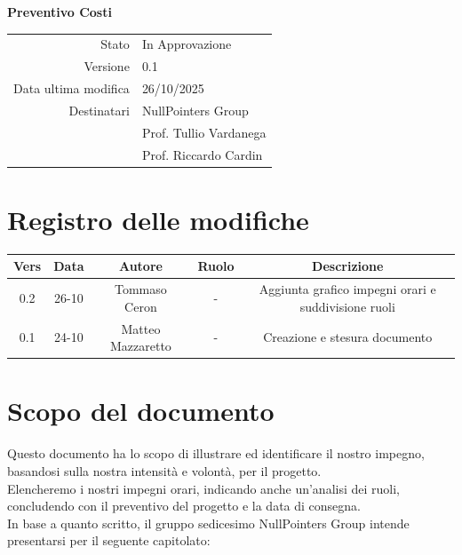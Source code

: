 \documentclass{article}
\begin{document}
	\vspace{2cm}
	
	{
		\centering
		\Huge\bfseries Preventivo Costi\par
		\vspace{0.5cm}
	}
	
	\begin{center}
		\begin{tabular}{r|l}
			Stato & In Approvazione \\
			Versione & 0.1 \\
			Data ultima modifica & 26/10/2025 \\
			Destinatari & NullPointers Group \\
			& Prof. Tullio Vardanega \\
			& Prof. Riccardo Cardin \\
		\end{tabular}
	\end{center}
	
	\newpage
	\section{Registro delle modifiche}
	
	\begin{table}[htbp]
		\begin{tabular}{|c|c|c|c|c|}
			\hline
			\rowcolor[gray]{0.9}
			Vers & Data & Autore & Ruolo & Descrizione \\
			\hline
			0.2 & 26-10 & Tommaso Ceron & - & Aggiunta grafico impegni orari e suddivisione ruoli\\
			\hline
			0.1 & 24-10 & Matteo Mazzaretto & - & Creazione e stesura documento \\
			\hline
		\end{tabular}
	\end{table}
	
	\newpage
	
	\section{Scopo del documento}
	Questo documento ha lo scopo di illustrare ed identificare il nostro impegno, basandosi sulla nostra intensità e volontà, per il progetto.\\
	Elencheremo i nostri impegni orari, indicando anche un'analisi dei ruoli, concludendo con il preventivo del progetto e la data di consegna.\\
	In base a quanto scritto, il gruppo sedicesimo NullPointers Group intende presentarsi per il seguente capitolato:\\
	\begin{center}
		
	\end{center}
	
\end{document}
